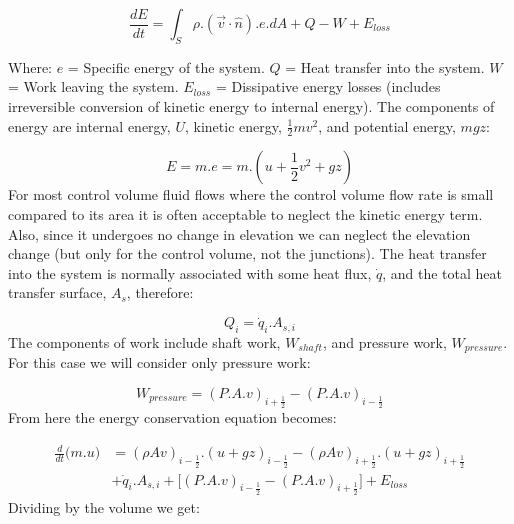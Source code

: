\documentclass[11pt,letterpaper,titlepage]{article}
\newcommand{\half}{\frac{1}{2}}
\begin{document}
\begin{equation*}
\frac{dE}{dt}=\int_S \rho.(\vec{v}\cdot \hat{n}).e.dA + Q - W +E_{loss}
\end{equation*}

\noindent 
Where: 
\newline \noindent $e$ \quad = Specific energy of the system.
\newline \noindent $Q$ \quad = Heat transfer into the system.
\newline \noindent $W$ \quad = Work leaving the system.
\newline \noindent $E_{loss}$ \quad = Dissipative energy losses (includes irreversible conversion of kinetic energy to internal energy).
\newline
\newline
The components of energy are internal energy, $U$, kinetic energy, $\half mv^2$, and potential energy, $mgz$:

\begin{equation*}
E= m.e = m.(u+\half v^2+gz)
\end{equation*}
\newline
For most control volume fluid flows where the control volume flow rate is small compared to its area it is often acceptable to neglect the kinetic energy term. Also, since it undergoes no change in elevation we can neglect the elevation change (but only for the control volume, not the junctions).
\newline
\newline
The heat transfer into the system is normally associated with some heat flux, $\dot{q}$, and the total heat transfer surface, $A_s$, therefore:

\begin{equation*}
Q_i=\dot{q}_i.A_{s,i}
\end{equation*}
\newline
The components of work include shaft work, $W_{shaft}$, and pressure work, $W_{pressure}$. For this case we will consider only pressure work:

\begin{equation*}
W_{pressure}=(P.A.v)_{i+\half} - (P.A.v)_{i-\half} 
\end{equation*}
\newline
\noindent
From here the energy conservation equation becomes:

\begin{equation*}
\begin{aligned}
\frac{d}{dt} \biggr( m.u \biggr)&=(\rho Av)_{i-\half}.(u+gz)_{i-\half} - (\rho Av)_{i+\half}.(u+gz)_{i+\half} \\
&+\dot{q}_i.A_{s,i} + \biggr[   (P.A.v)_{i-\half} - (P.A.v)_{i+\half}   \biggr] + E_{loss}
\end{aligned}
\end{equation*}
\newline
\noindent
Dividing by the volume we get:
\end{document}
